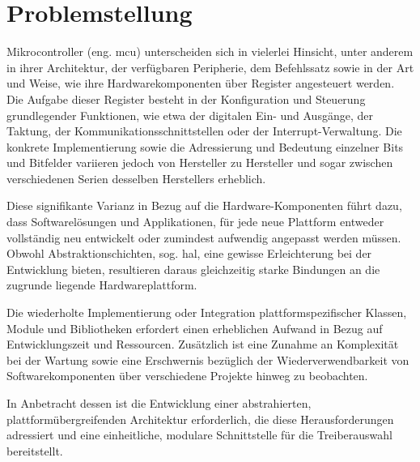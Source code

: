 \section{Problemstellung}
Mikrocontroller (eng. \gls{mcu}) unterscheiden sich in vielerlei Hinsicht, unter anderem in ihrer Architektur, der verfügbaren Peripherie, dem Befehlssatz sowie in der Art und Weise, wie ihre Hardwarekomponenten über Register angesteuert werden.
Die Aufgabe dieser Register besteht in der Konfiguration und Steuerung grundlegender Funktionen, wie etwa der digitalen Ein- und Ausgänge, der Taktung, der Kommunikationsschnittstellen oder der Interrupt-Verwaltung.
Die konkrete Implementierung sowie die Adressierung und Bedeutung einzelner Bits und Bitfelder variieren jedoch von Hersteller zu Hersteller und sogar zwischen verschiedenen Serien desselben Herstellers erheblich.

Diese signifikante Varianz in Bezug auf die Hardware-Komponenten führt dazu, dass Softwarelösungen und Applikationen, für jede neue Plattform entweder vollständig neu entwickelt oder zumindest aufwendig angepasst werden müssen.
Obwohl Abstraktionschichten, sog. \gls{hal}, eine gewisse Erleichterung bei der Entwicklung bieten, resultieren daraus gleichzeitig starke Bindungen an die zugrunde liegende Hardwareplattform.

Die wiederholte Implementierung oder Integration plattformspezifischer Klassen, Module und Bibliotheken erfordert einen erheblichen Aufwand in Bezug auf Entwicklungszeit und Ressourcen.
Zusätzlich ist eine Zunahme an Komplexität bei der Wartung sowie eine Erschwernis bezüglich der Wiederverwendbarkeit von Softwarekomponenten über verschiedene Projekte hinweg zu beobachten.

 In Anbetracht dessen ist die Entwicklung einer abstrahierten, plattformübergreifenden Architektur erforderlich, die diese Herausforderungen adressiert und eine einheitliche, modulare Schnittstelle für die Treiberauswahl bereitstellt.



